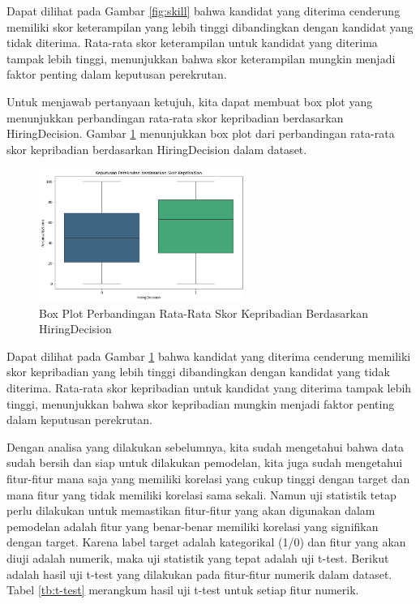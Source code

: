 Dapat dilihat pada Gambar \ref{fig:skill} bahwa kandidat yang diterima cenderung memiliki skor keterampilan yang lebih tinggi dibandingkan dengan kandidat yang tidak diterima. Rata-rata skor keterampilan untuk kandidat yang diterima tampak lebih tinggi, menunjukkan bahwa skor keterampilan mungkin menjadi faktor penting dalam keputusan perekrutan.

Untuk menjawab pertanyaan ketujuh, kita dapat membuat box plot yang menunjukkan perbandingan rata-rata skor kepribadian berdasarkan HiringDecision. Gambar \ref{fig:personality} menunjukkan box plot dari perbandingan rata-rata skor kepribadian berdasarkan HiringDecision dalam dataset.

\begin{figure}[H]
    \centering
    \includegraphics[width=0.6\textwidth]{gambar/personality.png}
    \caption{Box Plot Perbandingan Rata-Rata Skor Kepribadian Berdasarkan HiringDecision}
    \label{fig:personality}
\end{figure}

Dapat dilihat pada Gambar \ref{fig:personality} bahwa kandidat yang diterima cenderung memiliki skor kepribadian yang lebih tinggi dibandingkan dengan kandidat yang tidak diterima. Rata-rata skor kepribadian untuk kandidat yang diterima tampak lebih tinggi, menunjukkan bahwa skor kepribadian mungkin menjadi faktor penting dalam keputusan perekrutan.



Dengan analisa yang dilakukan sebelumnya, kita sudah mengetahui bahwa data sudah bersih dan siap untuk dilakukan pemodelan, kita juga sudah mengetahui fitur-fitur mana saja yang memiliki korelasi yang cukup tinggi dengan target dan mana fitur yang tidak memiliki korelasi sama sekali. Namun uji statistik tetap perlu dilakukan untuk memastikan fitur-fitur yang akan digunakan dalam pemodelan adalah fitur yang benar-benar memiliki korelasi yang signifikan dengan target. Karena label target adalah kategorikal (1/0) dan fitur yang akan diuji adalah numerik, maka uji statistik yang tepat adalah uji t-test. Berikut adalah hasil uji t-test yang dilakukan pada fitur-fitur numerik dalam dataset. Tabel \ref{tb:t-test} merangkum hasil uji t-test untuk setiap fitur numerik.

